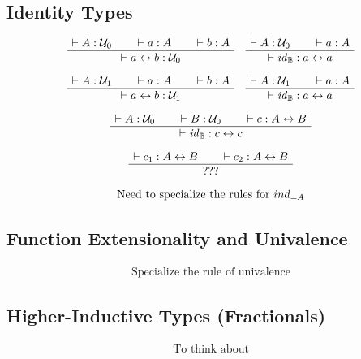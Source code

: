 \documentclass[format=acmlarge,review,natbib]{acmart}
\newcommand{\idc}{\mathit{id}_{\boolt}}
\newcommand{\iso}{\leftrightarrow}
\newcommand{\boolt}{\mathbb{B}}
\newcommand{\uzero}{\mathcal{U}_0}
\newcommand{\uone}{\mathcal{U}_1}
\newcommand{\proves}{\vdash}
\newcommand{\jdg}[2]{\proves #1 : #2}
\begin{document}
\subsection{Identity Types}

\[
  \begin{array}{c}
    \AxiomC{$\jdg{A}{\uzero}$}
    \AxiomC{$\jdg{a}{A}$}
    \AxiomC{$\jdg{b}{A}$}
    \TrinaryInfC{$\jdg{a \iso b}{\uzero}$}
    \DisplayProof
    \quad
    \AxiomC{$\jdg{A}{\uzero}$}
    \AxiomC{$\jdg{a}{A}$}
    \BinaryInfC{$\jdg{\idc}{a \iso a}$}
    \DisplayProof
    \\
    \\
    \AxiomC{$\jdg{A}{\uone}$}
    \AxiomC{$\jdg{a}{A}$}
    \AxiomC{$\jdg{b}{A}$}
    \TrinaryInfC{$\jdg{a \iso b}{\uone}$}
    \DisplayProof
    \quad
    \AxiomC{$\jdg{A}{\uone}$}
    \AxiomC{$\jdg{a}{A}$}
    \BinaryInfC{$\jdg{\idc}{a \iso a}$}
    \DisplayProof
    \\
    \\
    \AxiomC{$\jdg{A}{\uzero}$}
    \AxiomC{$\jdg{B}{\uzero}$}
    \AxiomC{$\jdg{c}{A \iso B}$}
    \TrinaryInfC{$\jdg{\idc}{c \iso c}$}
    \DisplayProof
    \\
    \\
    \AxiomC{$\jdg{c_1}{A \iso B}$}
    \AxiomC{$\jdg{c_2}{A \iso B}$}
    \BinaryInfC{$???$}
    \DisplayProof
    \\
    \\
    \mbox{Need to specialize the rules for } ind_{=A}
  \end{array}
\]

\subsection{Function Extensionality and Univalence}

\[
  \begin{array}{c}
    \mbox{Specialize the rule of univalence}
  \end{array}
\]

\subsection{Higher-Inductive Types (Fractionals)}

\[
  \begin{array}{c}
    \mbox{To think about}
  \end{array}
\]


{\footnotesize

}
\end{document}
